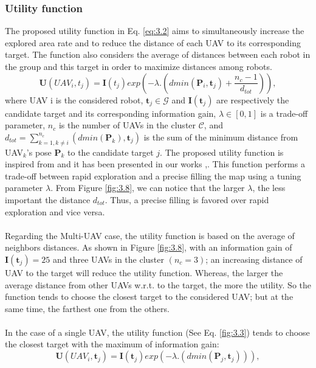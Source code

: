 \documentclass[11pt,openany]{book}
\begin{document}
\subsubsection{Utility function}
The proposed utility function in Eq. \ref{eq:3.2} aims to simultaneously increase the explored area rate and to reduce the distance of each UAV to its corresponding target. The function also considers the average of distances between each robot in the group and this target in order to maximize distances among robots.
\begin{equation}
    \mathbf{U}(UAV_i,t_j)=\mathbf{I}(t_j)exp(-\lambda.(dmin(\mathbf{P}_i,\mathbf{t}_j)+\frac{n_c-1}{d_{tot}})),
\end{equation}
where UAV i is the considered robot, $\mathbf{t}_j \in \mathcal{G}$ and $\mathbf{I}(\mathbf{t}_j)$ are respectively the candidate target and its corresponding information gain, $\lambda \in [0,1]$ is a trade-off parameter, $n_c$ is the number of UAVs in the cluster $\mathcal{C}$, and $d_{tot} = \sum_{k=1, k\neq i}^{n_c}(dmin(\mathbf{P}_k),\mathbf{t}_j) $ is the sum of the minimum distance from UAV$_k$'s pose $\mathbf{P}_k$ to the candidate target $j$. The proposed utility function is inspired from \cite{heng2015efficient} and it has been presented in our works \cite{mahdoui2017cooperative},\cite{mahdoui2018cooperative}. This function performs a trade-off between rapid exploration and a precise filling the map using a tuning parameter $\lambda$. From Figure \ref{fig:3.8}, we can notice that the larger $\lambda$, the less important the distance $d_{tot}$. Thus, a precise filling is favored over rapid exploration and vice versa.\\\\
Regarding the Multi-UAV case, the utility function is based on the average of neighbors distances. As shown in Figure \ref{fig:3.8}, with an information gain of $\mathbf{I}(\mathbf{t}_j)=25$ and three UAVs in the cluster $(n_c=3)$; an increasing distance of UAV to the target will reduce the utility function. Whereas, the larger the average distance from other UAVs w.r.t. to the target, the more the utility. So the function tends to choose the closest target to the considered UAV; but at the same time, the farthest one from the others.\\\\
In the case of a single UAV, the utility function (See Eq. \ref{fig:3.3}) tends to choose the closest target with the maximum of information gain:
\begin{equation}
    \mathbf{U}(UAV_i,\mathbf{t}_j)=\mathbf{I}(\mathbf{t}_j)exp(-\lambda.(dmin(\mathbf{P}_j,\mathbf{t}_j))),
\end{equation}
\end{document}
